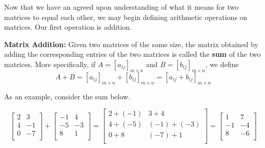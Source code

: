 \documentclass{ximera}
\begin{document}
Now that we have an agreed upon understanding of what it means for two matrices to equal each other, we may begin defining arithmetic operations on matrices.  Our first operation is addition.
\smallskip


\begin{definition} \label{matrixaddition}  \textbf{Matrix Addition:}  Given two matrices of the same size, the matrix obtained by adding the corresponding entries of the two matrices is called the  \textbf{sum} of the two matrices. More specifically,  if $A =\left[a_{ij}\right]_{m \times n}$ and $B =\left[b_{ij}\right]_{m \times n}$, we define \[A + B = \left[a_{ij}\right]_{m \times n} + \left[b_{ij}\right]_{m \times n} = \left[ a_{ij} + b_{ij} \right]_{m \times n}\] 

\end{definition}


\smallskip

As an example, consider the sum below.

\[ \left[ \begin{array}{rr}2 & 3 \\ 4 & -1 \\ 0 & -7 \\ \end{array} \right] + \left[ \begin{array}{rr} -1 & 4 \\ -5 & -3 \\ 8 & 1 \\ \end{array} \right] = \left[ \begin{array}{rr} 2 + (-1) & 3+4 \\ 4+(-5) & (-1)+(-3) \\ 0+8 & (-7)+ 1 \\ \end{array} \right]  = \left[ \begin{array}{rr} 1 & 7 \\ -1 & -4 \\ 8 & -6 \\ \end{array} \right] \]
\end{document}
